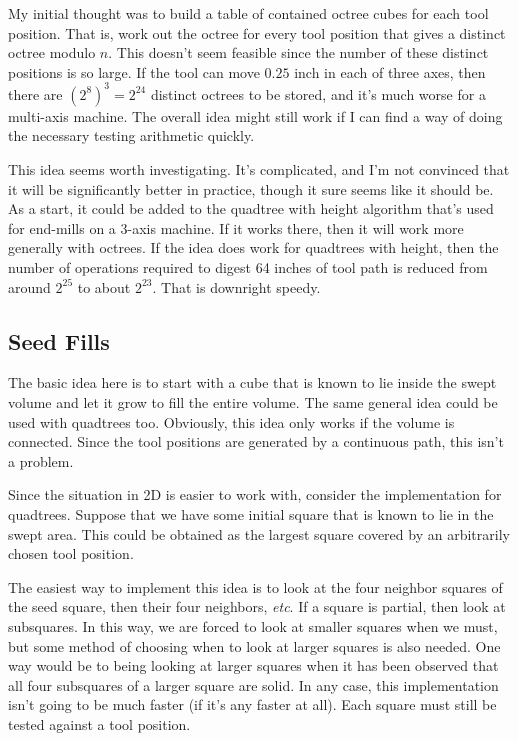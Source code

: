 \documentclass[titlepage,oneside,10pt]{article}
\begin{document}
My initial thought was to build a table of contained octree cubes for
each tool position. That is, work out the octree for every tool
position that gives a distinct octree modulo $n$. This doesn't seem
feasible since the number of these distinct positions is so large. If
the tool can move $0.25$ inch in each of three axes, then there are
$(2^8)^3 = 2^{24}$ distinct octrees to be stored, and it's much worse
for a multi-axis machine. The overall idea might still work if I can
find a way of doing the necessary testing arithmetic quickly.

This idea seems worth investigating. It's complicated, and I'm not
convinced that it will be significantly better in practice, though it
sure seems like it should be. As a start, it could be added to the
quadtree with height algorithm that's used for end-mills on a 3-axis
machine. If it works there, then it will work more generally with
octrees. If the idea does work for quadtrees with height, then the
number of operations required to digest 64 inches of tool path is
reduced from around $2^{25}$ to about $2^{23}$. That is downright speedy.

\subsection{Seed Fills}

The basic idea here is to start with a cube that is known to lie
inside the swept volume and let it grow to fill the entire volume. The
same general idea could be used with quadtrees too. Obviously, this
idea only works if the volume is connected. Since the tool positions
are generated by a continuous path, this isn't a problem.

Since the situation in 2D is easier to work with, consider the
implementation for quadtrees. Suppose that we have some initial square
that is known to lie in the swept area. This could be obtained as the
largest square covered by an arbitrarily chosen tool position.

The easiest way to implement this idea is to look at the four neighbor
squares of the seed square, then their four neighbors, \emph{etc}. If
a square is partial, then look at subsquares. In this way, we are
forced to look at smaller squares when we must, but some method of
choosing when to look at larger squares is also needed. One way would
be to being looking at larger squares when it has been observed that
all four subsquares of a larger square are solid. In any case, this
implementation isn't going to be much faster (if it's any faster at
all). Each square must still be tested against a tool position.
\end{document}

